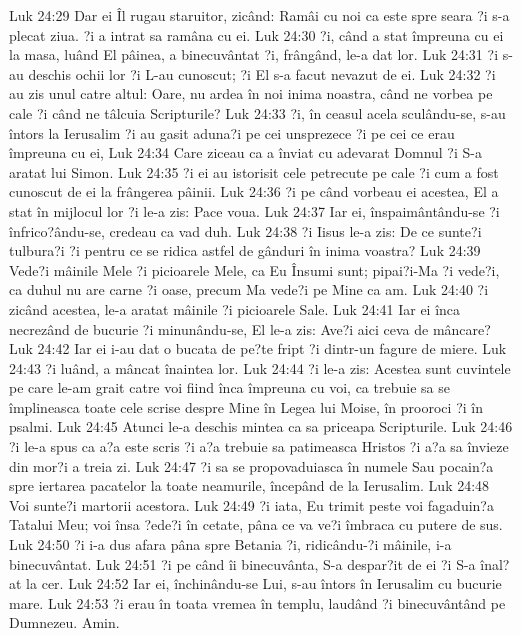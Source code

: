 Luk 24:29  Dar ei Îl rugau staruitor, zicând: Ramâi cu noi ca este spre seara ?i s-a plecat ziua. ?i a intrat sa ramâna cu ei.
Luk 24:30  ?i, când a stat împreuna cu ei la masa, luând El pâinea, a binecuvântat ?i, frângând, le-a dat lor.
Luk 24:31  ?i s-au deschis ochii lor ?i L-au cunoscut; ?i El s-a facut nevazut de ei.
Luk 24:32  ?i au zis unul catre altul: Oare, nu ardea în noi inima noastra, când ne vorbea pe cale ?i când ne tâlcuia Scripturile?
Luk 24:33  ?i, în ceasul acela sculându-se, s-au întors la Ierusalim ?i au gasit aduna?i pe cei unsprezece ?i pe cei ce erau împreuna cu ei,
Luk 24:34  Care ziceau ca a înviat cu adevarat Domnul ?i S-a aratat lui Simon.
Luk 24:35  ?i ei au istorisit cele petrecute pe cale ?i cum a fost cunoscut de ei la frângerea pâinii.
Luk 24:36  ?i pe când vorbeau ei acestea, El a stat în mijlocul lor ?i le-a zis: Pace voua.
Luk 24:37  Iar ei, înspaimântându-se ?i înfrico?ându-se, credeau ca vad duh.
Luk 24:38  ?i Iisus le-a zis: De ce sunte?i tulbura?i ?i pentru ce se ridica astfel de gânduri în inima voastra?
Luk 24:39  Vede?i mâinile Mele ?i picioarele Mele, ca Eu Însumi sunt; pipai?i-Ma ?i vede?i, ca duhul nu are carne ?i oase, precum Ma vede?i pe Mine ca am.
Luk 24:40  ?i zicând acestea, le-a aratat mâinile ?i picioarele Sale.
Luk 24:41  Iar ei înca necrezând de bucurie ?i minunându-se, El le-a zis: Ave?i aici ceva de mâncare?
Luk 24:42  Iar ei i-au dat o bucata de pe?te fript ?i dintr-un fagure de miere.
Luk 24:43  ?i luând, a mâncat înaintea lor.
Luk 24:44  ?i le-a zis: Acestea sunt cuvintele pe care le-am grait catre voi fiind înca împreuna cu voi, ca trebuie sa se împlineasca toate cele scrise despre Mine în Legea lui Moise, în prooroci ?i în psalmi.
Luk 24:45  Atunci le-a deschis mintea ca sa priceapa Scripturile.
Luk 24:46  ?i le-a spus ca a?a este scris ?i a?a trebuie sa patimeasca Hristos ?i a?a sa învieze din mor?i a treia zi.
Luk 24:47  ?i sa se propovaduiasca în numele Sau pocain?a spre iertarea pacatelor la toate neamurile, începând de la Ierusalim.
Luk 24:48  Voi sunte?i martorii acestora.
Luk 24:49  ?i iata, Eu trimit peste voi fagaduin?a Tatalui Meu; voi însa ?ede?i în cetate, pâna ce va ve?i îmbraca cu putere de sus.
Luk 24:50  ?i i-a dus afara pâna spre Betania ?i, ridicându-?i mâinile, i-a binecuvântat.
Luk 24:51  ?i pe când îi binecuvânta, S-a despar?it de ei ?i S-a înal?at la cer.
Luk 24:52  Iar ei, închinându-se Lui, s-au întors în Ierusalim cu bucurie mare.
Luk 24:53  ?i erau în toata vremea în templu, laudând ?i binecuvântând pe Dumnezeu. Amin.


